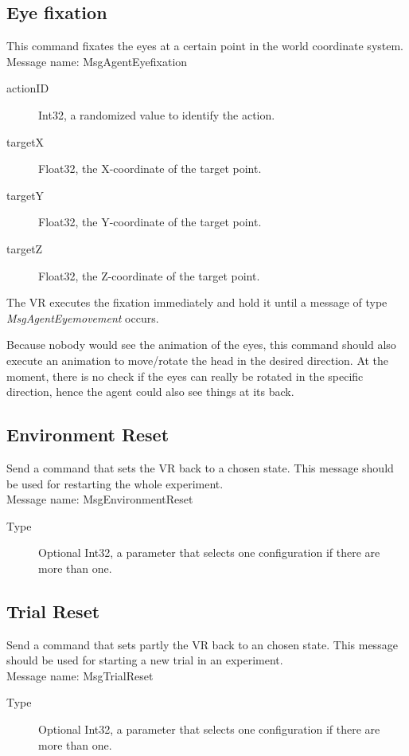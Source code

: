 \documentclass[a4paper,10pt]{scrartcl}
\begin{document}
\subsection{Eye fixation}
This command fixates the eyes at a certain point  in the world coordinate system.\\
Message name: MsgAgentEyefixation
\begin{description}
 \item [actionID] Int32, a randomized value to identify the action.
 \item [targetX] Float32, the X-coordinate of the target point.
 \item [targetY] Float32, the Y-coordinate of the target point.
 \item [targetZ] Float32, the Z-coordinate of the target point.
\end{description}
The VR executes the fixation immediately and hold it until a message of type \emph{MsgAgentEyemovement} occurs.

Because nobody would see the animation of the eyes, this command should also execute an animation to move/rotate the head in the desired direction.
At the moment, there is no check if the eyes can really be rotated in the specific direction, hence the agent could also see things at its back. 

\subsection{Environment Reset}
Send a command that sets the VR back to a chosen state. This message should be used for restarting the whole experiment.\\
Message name: MsgEnvironmentReset
\begin{description}
 \item [Type] Optional Int32, a parameter that selects one configuration if there are more than one.
\end{description}

\subsection{Trial Reset}
Send a command that sets partly the VR back to an chosen state. This message should be used for starting a new trial in an experiment.\\
Message name: MsgTrialReset
\begin{description}
 \item [Type] Optional Int32, a parameter that selects one configuration if there are more than one.
\end{description}
\end{document}
